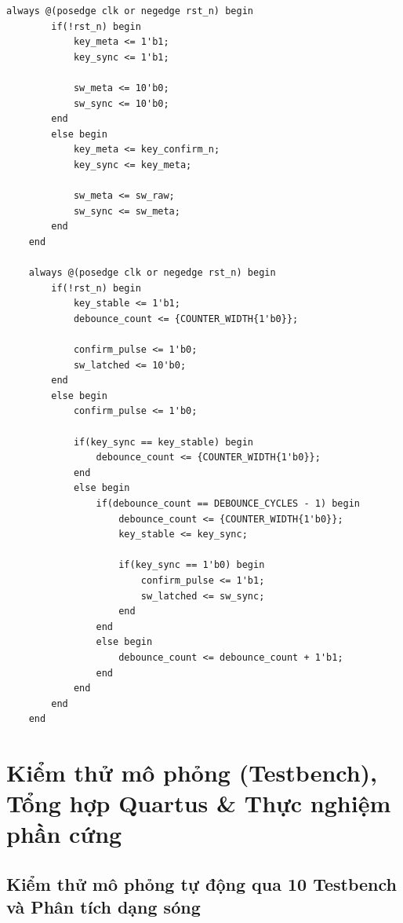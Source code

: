 \documentclass[11pt,a4paper]{report}
\begin{document}
\begin{lstlisting}[style=verilogstyle, caption={Mạch đồng bộ 2 tầng FF và bộ lọc dội 10\,ms trong \texttt{rtl/board/input\_control.v}}, label={lst:input-control}]
    always @(posedge clk or negedge rst_n) begin
        if(!rst_n) begin
            key_meta <= 1'b1;
            key_sync <= 1'b1;

            sw_meta <= 10'b0;
            sw_sync <= 10'b0;
        end
        else begin
            key_meta <= key_confirm_n;
            key_sync <= key_meta;

            sw_meta <= sw_raw;
            sw_sync <= sw_meta;
        end
    end

    always @(posedge clk or negedge rst_n) begin
        if(!rst_n) begin
            key_stable <= 1'b1;
            debounce_count <= {COUNTER_WIDTH{1'b0}};

            confirm_pulse <= 1'b0;
            sw_latched <= 10'b0;
        end
        else begin 
            confirm_pulse <= 1'b0;

            if(key_sync == key_stable) begin
                debounce_count <= {COUNTER_WIDTH{1'b0}};
            end
            else begin
                if(debounce_count == DEBOUNCE_CYCLES - 1) begin
                    debounce_count <= {COUNTER_WIDTH{1'b0}};
                    key_stable <= key_sync;

                    if(key_sync == 1'b0) begin
                        confirm_pulse <= 1'b1;
                        sw_latched <= sw_sync;
                    end
                end 
                else begin
                    debounce_count <= debounce_count + 1'b1;
                end
            end
        end
    end
\end{lstlisting}

\section{Kiểm thử mô phỏng (Testbench), Tổng hợp Quartus \& Thực nghiệm phần cứng}
\label{sec:verif-synth}

\subsection{Kiểm thử mô phỏng tự động qua 10 Testbench và Phân tích dạng sóng}
\label{subsec:tb-wave}
\end{document}
